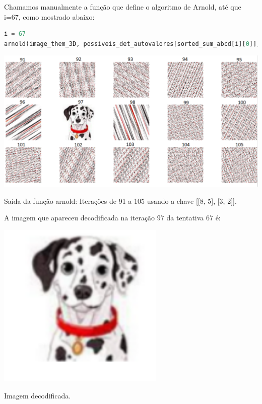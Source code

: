 \documentclass[a4paper, 12pt]{article}
\begin{document}
Chamamos manualmente a função que define o algoritmo de Arnold, até que i=67, como mostrado abaixo:

\begin{lstlisting}[language=Python, caption = chamada do algorítimo de Arnold.]
i = 67
arnold(image_them_3D, possiveis_det_autovalores[sorted_sum_abcd[i][0]], it=150)

\end{lstlisting}

\begin{center}
    \includegraphics[width=16cm]{ihuuu_01.PNG}
    
    Saída da função arnold: Iterações de 91 a 105 usando a chave [[8, 5], [3, 2]].
\end{center}

A imagem que apareceu decodificada na iteração 97 da tentativa 67 é:

\begin{center}
    \includegraphics[width=8cm]{ihuuu.PNG}
    
    Imagem decodificada.
\end{center}
\end{document}
